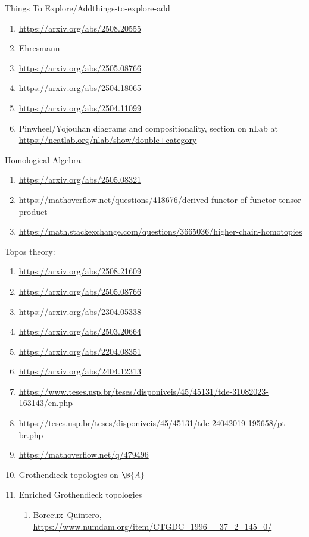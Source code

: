 \begin{remark}{Things To Explore/Add}{things-to-explore-add}
    \begin{enumerate}
        \item \url{https://arxiv.org/abs/2508.20555}
        \item Ehresmann
        \item \url{https://arxiv.org/abs/2505.08766}
        \item \url{https://arxiv.org/abs/2504.18065}
        \item \url{https://arxiv.org/abs/2504.11099}
        \item Pinwheel/Yojouhan diagrams and compositionality, section on nLab at \url{https://ncatlab.org/nlab/show/double+category}
    \end{enumerate}
    Homological Algebra:
    \begin{enumerate}
        \item \url{https://arxiv.org/abs/2505.08321}
        \item \url{https://mathoverflow.net/questions/418676/derived-functor-of-functor-tensor-product}
        \item \url{https://math.stackexchange.com/questions/3665036/higher-chain-homotopies}
    \end{enumerate}
    Topos theory:
    \begin{enumerate}
        \item \url{https://arxiv.org/abs/2508.21609}
        \item \url{https://arxiv.org/abs/2505.08766}
        \item \url{https://arxiv.org/abs/2304.05338}
        \item \url{https://arxiv.org/abs/2503.20664}
        \item \url{https://arxiv.org/abs/2204.08351}
        \item \url{https://arxiv.org/abs/2404.12313}
        \item \url{https://www.teses.usp.br/teses/disponiveis/45/45131/tde-31082023-163143/en.php}
        \item \url{https://teses.usp.br/teses/disponiveis/45/45131/tde-24042019-195658/pt-br.php}
        \item \url{https://mathoverflow.net/q/479496}
        \item Grothendieck topologies on $\B{A}$
        \item Enriched Grothendieck topologies
            \begin{enumerate}
                \item Borceux--Quintero, \url{https://www.numdam.org/item/CTGDC_1996__37_2_145_0/}

\end{enumerate}
\end{enumerate}
\end{remark}
